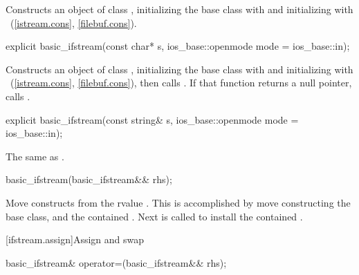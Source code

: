 \begin{itemdescr}
\pnum
\effects
Constructs an object of class
,
initializing the base class with
and initializing  with
~(\ref{istream.cons},
\ref{filebuf.cons}).
\end{itemdescr}

%
\begin{itemdecl}
explicit basic_ifstream(const char* s,
                        ios_base::openmode mode = ios_base::in);
\end{itemdecl}

\begin{itemdescr}
\pnum
\effects
Constructs an object of class
,
initializing the base class with
and initializing  with
~(\ref{istream.cons},
\ref{filebuf.cons}),
then calls
.
If that function returns a null pointer, calls
.
\end{itemdescr}

%
\begin{itemdecl}
explicit basic_ifstream(const string& s,
                        ios_base::openmode mode = ios_base::in);
\end{itemdecl}

\begin{itemdescr}
\pnum
\effects The same as .
\end{itemdescr}

%
\begin{itemdecl}
basic_ifstream(basic_ifstream&& rhs);
\end{itemdecl}

\begin{itemdescr}
\pnum
\effects Move constructs from the rvalue . This
is accomplished by move constructing the base class, and the contained
. Next
 is called to install
the contained .
\end{itemdescr}

[ifstream.assign]{Assign and swap}

%
%
\begin{itemdecl}
basic_ifstream& operator=(basic_ifstream&& rhs);
\end{itemdecl}

